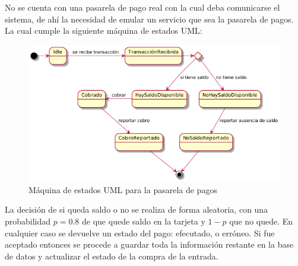 No se cuenta con una pasarela de pago real con la cual deba comunicarse el sistema, de ahí la necesidad de emular un servicio que sea la pasarela de pagos. La cual cumple la siguiente máquina de estados UML:

\begin{figure}[h!]
    \centering
    \includegraphics[width=13cm]{./chapters/img/pasarela.png}

    \label{fig:pasarela}
    \caption{Máquina de estados UML para la pasarela de pagos}
\end{figure}

La decisión de si queda saldo o no se realiza de forma aleatoria, con una probabilidad $p = 0.8$ de que quede saldo en la tarjeta y $1- p$ que no quede. En cualquier caso se devuelve un estado del pago: efecutado, o erróneo. Si fue aceptado entonces se procede a guardar toda la información restante en la base de datos y actualizar el estado de la compra de la entrada.
